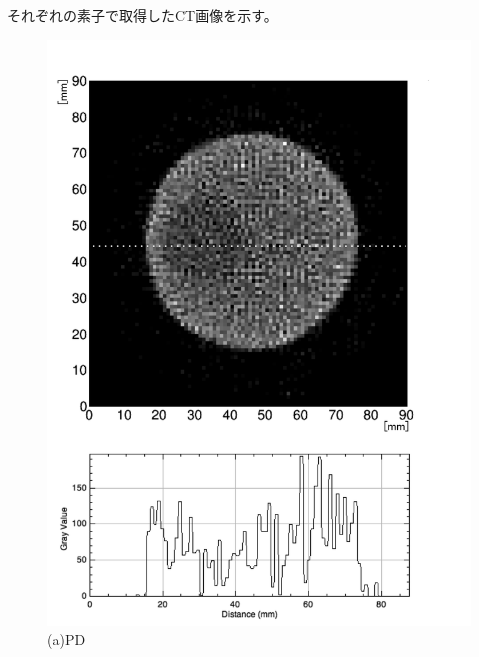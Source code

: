 それぞれの素子で取得したCT画像を示す。


\begin{figure}[H]
 \begin{minipage}{0.52\hsize}
  \begin{center}
   \includegraphics[bb=0.000000 0.000000 564.433340 778.975605,width=1.01\hsize]{image2/chapter5/low_contrast_PD_slice.png}
  \end{center}
  \vspace{-0.7cm}
  \caption*{(a)PD}
 \end{minipage}
 \begin{minipage}{0.52\hsize}
  \begin{center}

\end{center}
\end{minipage}
\end{figure}
